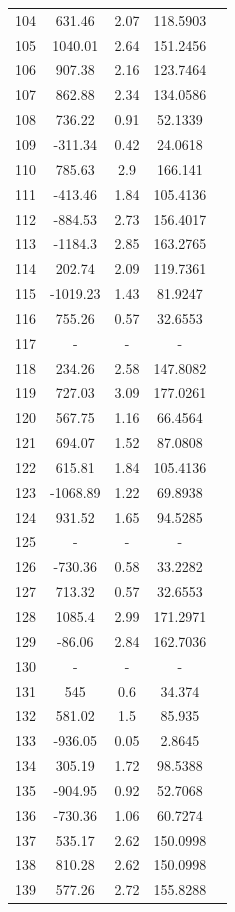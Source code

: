 {\begin{longtable}{ccccc}
104 & 631.46 & 2.07 & 118.5903 \\ 
105 & 1040.01 & 2.64 & 151.2456 \\ 
106 & 907.38 & 2.16 & 123.7464 \\ 
107 & 862.88 & 2.34 & 134.0586 \\ 
108 & 736.22 & 0.91 & 52.1339 \\ 
109 & -311.34 & 0.42 & 24.0618 \\ 
110 & 785.63 & 2.9 & 166.141 \\ 
111 & -413.46 & 1.84 & 105.4136 \\ 
112 & -884.53 & 2.73 & 156.4017 \\ 
113 & -1184.3 & 2.85 & 163.2765 \\ 
114 & 202.74 & 2.09 & 119.7361 \\ 
115 & -1019.23 & 1.43 & 81.9247 \\ 
116 & 755.26 & 0.57 & 32.6553 \\ 
117 & - & - & - \\ 
118 & 234.26 & 2.58 & 147.8082 \\ 
119 & 727.03 & 3.09 & 177.0261 \\ 
120 & 567.75 & 1.16 & 66.4564 \\ 
121 & 694.07 & 1.52 & 87.0808 \\ 
122 & 615.81 & 1.84 & 105.4136 \\ 
123 & -1068.89 & 1.22 & 69.8938 \\ 
124 & 931.52 & 1.65 & 94.5285 \\ 
125 & - & - & - \\ 
126 & -730.36 & 0.58 & 33.2282 \\ 
127 & 713.32 & 0.57 & 32.6553 \\ 
128 & 1085.4 & 2.99 & 171.2971 \\ 
129 & -86.06 & 2.84 & 162.7036 \\ 
130 & - & - & - \\ 
131 & 545 & 0.6 & 34.374 \\ 
132 & 581.02 & 1.5 & 85.935 \\ 
133 & -936.05 & 0.05 & 2.8645 \\ 
134 & 305.19 & 1.72 & 98.5388 \\ 
135 & -904.95 & 0.92 & 52.7068 \\ 
136 & -730.36 & 1.06 & 60.7274 \\ 
137 & 535.17 & 2.62 & 150.0998 \\ 
138 & 810.28 & 2.62 & 150.0998 \\ 
139 & 577.26 & 2.72 & 155.8288 \\ 

\end{longtable}}
